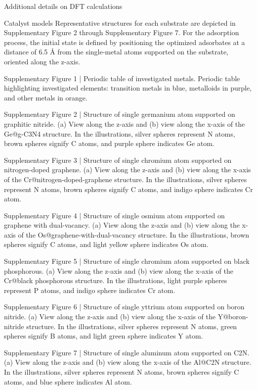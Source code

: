 Additional details on DFT calculations

Catalyst models
Representative structures for each substrate are depicted in Supplementary Figure 2 through Supplementary Figure 7. For the adsorption process, the initial state is defined by positioning the optimized adsorbates at a distance of 6.5 Å from the single-metal atoms supported on the substrate, oriented along the z-axis.


Supplementary Figure 1 | Periodic table of investigated metals. Periodic table highlighting investigated elements: transition metals in blue, metalloids in purple, and other metals in orange.


Supplementary Figure 2 | Structure of single germanium atom supported on graphitic nitride. (a) View along the z-axis and (b) view along the x-axis of the Ge@g-C3N4 structure. In the illustrations, silver spheres represent N atoms, brown spheres signify C atoms, and purple sphere indicates Ge atom.


Supplementary Figure 3 | Structure of single chromium atom supported on nitrogen-doped graphene. (a) View along the z-axis and (b) view along the x-axis of the Cr@nitrogen-doped-graphene structure. In the illustrations, silver spheres represent N atoms, brown spheres signify C atoms, and indigo sphere indicates Cr atom.


Supplementary Figure 4 | Structure of single osmium atom supported on graphene with dual-vacancy. (a) View along the z-axis and (b) view along the x-axis of the Os@graphene-with-dual-vacancy structure. In the illustrations, brown spheres signify C atoms, and light yellow sphere indicates Os atom.


Supplementary Figure 5 | Structure of single chromium atom supported on black phosphorous. (a) View along the z-axis and (b) view along the x-axis of the Cr@black phosphorous structure. In the illustrations, light purple spheres represent P atoms, and indigo sphere indicates Cr atom.


Supplementary Figure 6 | Structure of single yttrium atom supported on boron nitride. (a) View along the z-axis and (b) view along the x-axis of the Y@boron-nitride structure. In the illustrations, silver spheres represent N atoms, green spheres signify B atoms, and light green sphere indicates Y atom.


Supplementary Figure 7 | Structure of single aluminum atom supported on C2N. (a) View along the z-axis and (b) view along the x-axis of the Al@C2N structure. In the illustrations, silver spheres represent N atoms, brown spheres signify C atoms, and blue sphere indicates Al atom.


